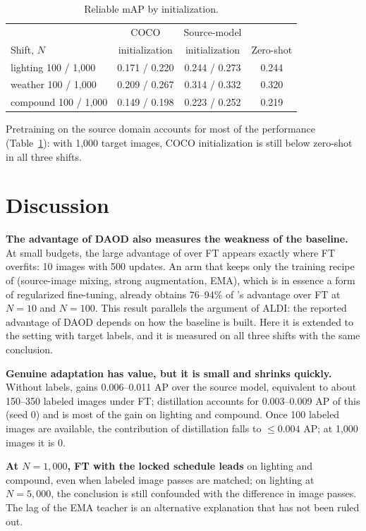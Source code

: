 \begin{table}[t]
\centering
\caption{Reliable mAP by initialization.}
\label{tab:coco}
\footnotesize
\setlength{\tabcolsep}{3pt}
\begin{tabular}{@{}lccc@{}}
\toprule
 & COCO & Source-model & \\
Shift, $N$ & initialization & initialization & Zero-shot \\
\midrule
lighting 100 / 1,000 & 0.171 / 0.220 & 0.244 / 0.273 & 0.244 \\
weather 100 / 1,000 & 0.209 / 0.267 & 0.314 / 0.332 & 0.320 \\
compound 100 / 1,000 & 0.149 / 0.198 & 0.223 / 0.252 & 0.219 \\
\bottomrule
\end{tabular}
\end{table}

Pretraining on the source domain accounts for most of the performance (Table~\ref{tab:coco}): with 1,000 target images, COCO initialization is still below zero-shot in all three shifts.

\section{Discussion}\label{sec:discussion}

\textbf{The advantage of DAOD also measures the weakness of the baseline.} At small budgets, the large advantage of \aldi over FT appears exactly where FT overfits: 10 images with 500 updates. An arm that keeps only the training recipe of \aldi (source-image mixing, strong augmentation, EMA), which is in essence a form of regularized fine-tuning, already obtains 76--94\% of \aldi's advantage over FT at $N = 10$ and $N = 100$. This result parallels the argument of ALDI: the reported advantage of DAOD depends on how the baseline is built. Here it is extended to the setting with target labels, and it is measured on all three shifts with the same conclusion.

\textbf{Genuine adaptation has value, but it is small and shrinks quickly.} Without labels, \aldi gains 0.006--0.011 AP over the source model, equivalent to about 150--350 labeled images under FT; distillation accounts for 0.003--0.009 AP of this (seed 0) and is most of the gain on lighting and compound. Once 100 labeled images are available, the contribution of distillation falls to $\leq 0.004$ AP; at 1,000 images it is 0.

\textbf{At $N = 1{,}000$, FT with the locked schedule leads} on lighting and compound, even when labeled image passes are matched; on lighting at $N = 5{,}000$, the conclusion is still confounded with the difference in image passes. The lag of the EMA teacher is an alternative explanation that has not been ruled out.


